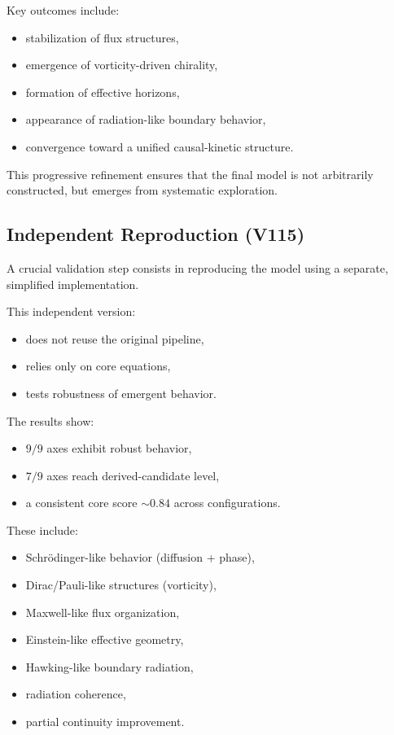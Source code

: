 \documentclass[11pt]{article}
\begin{document}
Key outcomes include:

\begin{itemize}
\item stabilization of flux structures,
\item emergence of vorticity-driven chirality,
\item formation of effective horizons,
\item appearance of radiation-like boundary behavior,
\item convergence toward a unified causal-kinetic structure.
\end{itemize}

This progressive refinement ensures that the final model is not arbitrarily constructed, but emerges from systematic exploration.

\subsection{Independent Reproduction (V115)}

A crucial validation step consists in reproducing the model using a separate, simplified implementation.

This independent version:

\begin{itemize}
\item does not reuse the original pipeline,
\item relies only on core equations,
\item tests robustness of emergent behavior.
\end{itemize}

The results show:

\begin{itemize}
\item $9/9$ axes exhibit robust behavior,
\item $7/9$ axes reach derived-candidate level,
\item a consistent core score $\sim 0.84$ across configurations.
\end{itemize}

These include:

\begin{itemize}
\item Schrödinger-like behavior (diffusion + phase),
\item Dirac/Pauli-like structures (vorticity),
\item Maxwell-like flux organization,
\item Einstein-like effective geometry,
\item Hawking-like boundary radiation,
\item radiation coherence,
\item partial continuity improvement.
\end{itemize}
\end{document}
